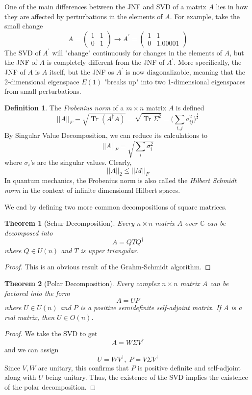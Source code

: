 \documentclass{article}
\DeclareMathOperator{\Tr}{Tr}
\newtheorem{theorem}{Theorem}[section]
\theoremstyle{remark}
\theoremstyle{definition}
\newtheorem{definition}{Definition}[section]
\begin{document}
One of the main differences between the JNF and SVD of a matrix $A$ lies in how they are affected by perturbations in the elements of $A$. For example, take the small change 
\[ A = \begin{pmatrix}
1 & 1\\
0 & 1
\end{pmatrix} \longrightarrow A^\prime  = \begin{pmatrix}
1 & 1 \\
0 & 1.00001
\end{pmatrix}\]
The SVD of $A^\prime$ will "change" continuously for changes in the elements of $A$, but the JNF of $A$ is completely different from the JNF of $A^\prime$. More specifically, the JNF of $A$ is $A$ itself, but the JNF os $A^\prime$ is now diagonalizable, meaning that the 2-dimensional eigenspace $E(1)$ "breaks up" into two 1-dimensional eigenspaces from small perturbations. 

\begin{definition}
The \textit{Frobenius norm} of a $m \times n$ matrix $A$ is defined
\[||A||_F \equiv \sqrt{\Tr{(A^\dagger A)}} = \sqrt{\Tr{\Sigma^2}} = \bigg( \sum_{i, j} a_{i j}^2 \bigg)^{\frac{1}{2}} \]
By Singular Value Decomposition, we can reduce its calculations to
\[ ||A||_F = \sqrt{\sum_i \sigma_i^2}\]
where $\sigma_i$'s are the singular values. Clearly, 
\[||A||_2 \leq ||M||_F\]
In quantum mechanics, the Frobenius norm is also called the \textit{Hilbert Schmidt norm} in the context of infinite dimensional Hilbert spaces. 
\end{definition}

We end by defining two more common decompositions of square matrices. 

\begin{theorem}[Schur Decomposition]
Every $n \times n$ matrix $A$ over $\mathbb{C}$ can be decomposed into
\[A = Q T Q^\dagger\]
where $Q \in U(n)$ and $T$ is upper triangular. 
\end{theorem}
\begin{proof}
This is an obvious result of the Grahm-Schmidt algorithm. 
\end{proof}

\begin{theorem}[Polar Decomposition]
Every complex $n \times n$ matrix $A$ can be factored into the form
\[A = U P\]
where $U \in U(n)$ and $P$ is a positive semidefinite self-adjoint matrix. If $A$ is a real matrix, then $U \in O(n)$. 
\end{theorem}
\begin{proof}
We take the SVD to get 
\[A = W \Sigma V^\dagger\]
and we can assign 
\[U = W V^\dagger, \; P = V \Sigma V^\dagger\]
Since $V, W$ are unitary, this confirms that $P$ is positive definite and self-adjoint along with $U$ being unitary. Thus, the existence of the SVD implies the existence of the polar decomposition. 
\end{proof}
\end{document}
